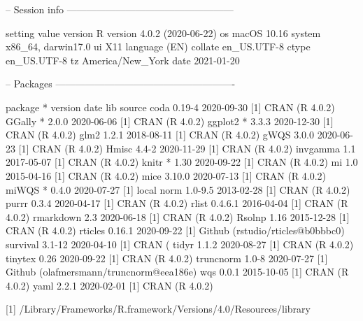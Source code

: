 \begin{Schunk}
\begin{Soutput}
 -- Session info ---------------------------------------------------
\end{Soutput}
\begin{Soutput}
 setting  value                       
 version  R version 4.0.2 (2020-06-22)
 os       macOS  10.16                
 system   x86_64, darwin17.0          
 ui       X11                         
 language (EN)                        
 collate  en_US.UTF-8                 
 ctype    en_US.UTF-8                 
 tz       America/New_York            
 date     2021-01-20                  
\end{Soutput}
\begin{Soutput}
--  Packages -------------------------------------------------------
\end{Soutput}
\begin{Soutput}
 package   * version date       lib source                                 
 coda        0.19-4  2020-09-30 [1] CRAN (R 4.0.2)                         
 GGally    * 2.0.0   2020-06-06 [1] CRAN (R 4.0.2)                         
 ggplot2   * 3.3.3   2020-12-30 [1] CRAN (R 4.0.2)                         
 glm2        1.2.1   2018-08-11 [1] CRAN (R 4.0.2)                         
 gWQS        3.0.0   2020-06-23 [1] CRAN (R 4.0.2)                         
 Hmisc       4.4-2   2020-11-29 [1] CRAN (R 4.0.2)                         
 invgamma    1.1     2017-05-07 [1] CRAN (R 4.0.2)                         
 knitr     * 1.30    2020-09-22 [1] CRAN (R 4.0.2)                         
 mi          1.0     2015-04-16 [1] CRAN (R 4.0.2)                         
 mice        3.10.0  2020-07-13 [1] CRAN (R 4.0.2)                         
 miWQS     * 0.4.0   2020-07-27 [1] local                                  
 norm        1.0-9.5 2013-02-28 [1] CRAN (R 4.0.2)                         
 purrr       0.3.4   2020-04-17 [1] CRAN (R 4.0.2)                         
 rlist       0.4.6.1 2016-04-04 [1] CRAN (R 4.0.2)                         
 rmarkdown   2.3     2020-06-18 [1] CRAN (R 4.0.2)                         
 Rsolnp      1.16    2015-12-28 [1] CRAN (R 4.0.2)                         
 rticles     0.16.1  2020-09-22 [1] Github (rstudio/rticles@b0bbbc0)       
 survival    3.1-12  2020-04-10 [1] CRAN (                                 
 tidyr       1.1.2   2020-08-27 [1] CRAN (R 4.0.2)                         
 tinytex     0.26    2020-09-22 [1] CRAN (R 4.0.2)                         
 truncnorm   1.0-8   2020-07-27 [1] Github (olafmersmann/truncnorm@eea186e)
 wqs         0.0.1   2015-10-05 [1] CRAN (R 4.0.2)                         
 yaml        2.2.1   2020-02-01 [1] CRAN (R 4.0.2)                         

[1] /Library/Frameworks/R.framework/Versions/4.0/Resources/library
\end{Soutput}
\end{Schunk}

